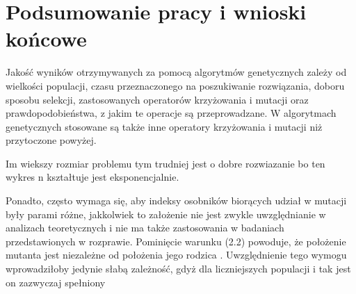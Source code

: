 \chapter{Podsumowanie pracy i wnioski końcowe}\label{cha:pierwszyDokument}

Jakość wyników otrzymywanych za pomocą algorytmów genetycznych zależy
od wielkości populacji, czasu przeznaczonego na poszukiwanie rozwiązania, doboru
sposobu selekcji, zastosowanych operatorów krzyżowania i mutacji oraz prawdopodobieństwa, z jakim te operacje są przeprowadzane. W algorytmach genetycznych
stosowane są także inne operatory krzyżowania i mutacji niż przytoczone powyżej. \\
\par
Im wiekszy rozmiar problemu tym trudniej jest o dobre rozwiazanie bo ten wykres n kształtuje jest eksponencjalnie.\\
\par
 Ponadto,
często wymaga się, aby indeksy osobników biorących udział w mutacji były parami
różne, jakkolwiek to założenie nie jest zwykle uwzględnianie w analizach teoretycznych
i nie ma także zastosowania w badaniach przedstawionych w rozprawie. Pominięcie
warunku (2.2) powoduje, że położenie mutanta 
jest niezależne od położenia jego
rodzica \cite{diff2}
. Uwzględnienie tego wymogu wprowadziłoby jedynie słabą zależność,
gdyż dla liczniejszych populacji i tak jest on zazwyczaj spełniony